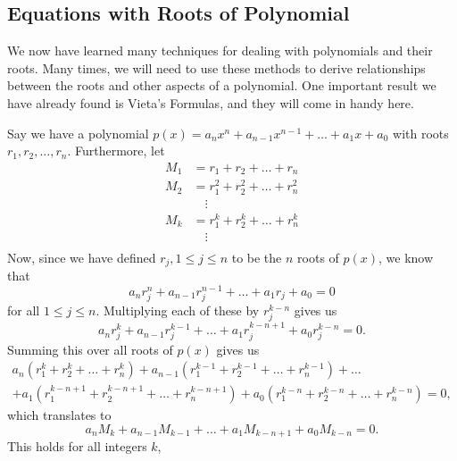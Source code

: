 \documentclass[12pt]{article}
\begin{document}
\newpage

\subsection{Equations with Roots of Polynomial}
We now have learned many techniques for dealing with polynomials and their roots. Many times, we will need to use these methods to derive relationships between the roots and other aspects of a polynomial. One important result we have already found is Vieta's Formulas, and they will come in handy here.
\begin{tcolorbox}[colback=green!10!white, colframe=green!25!black, title=Newton's Sums]
    Say we have a polynomial $p(x)=a_nx^n+a_{n-1}x^{n-1}+\dots+a_1x+a_0$ with roots $r_1,r_2,\dots,r_n$. Furthermore, let 
    \begin{align*}
        M_1&=r_1+r_2+\dots+r_n\\
        M_2&=r_1^2+r_2^2+\dots+r_n^2\\
        &\quad\!\! \vdots\\
        M_k&=r_1^k+r_2^k+\dots+r_n^k\\
        &\quad\!\! \vdots\\
    \end{align*}
    Now, since we have defined $r_j, 1\le j\le n$ to be the $n$ roots of $p(x)$, we know that
    \[
        a_nr_j^n+a_{n-1}r_j^{n-1}+\dots+a_1r_j+a_0=0
    \]
    for all $1\le j\le n$. Multiplying each of these by $r_j^{k-n}$ gives us 
    \[
        a_nr_j^k+a_{n-1}r_j^{k-1}+\dots+a_1r_j^{k-n+1}+a_0r_j^{k-n}=0.
    \]
    Summing this over all roots of $p(x)$ gives us
    \begin{multline*}
        a_n\left(r_1^k+r_2^k+\dots+r_n^k\right)+a_{n-1}\left(r_1^{k-1}+r_2^{k-1}+\dots+r_n^{k-1}\right)+\dots\\ + a_1\left(r_1^{k-n+1}+r_2^{k-n+1}+\dots+r_n^{k-n+1}\right)+a_0\left(r_1^{k-n}+r_2^{k-n}+\dots+r_n^{k-n}\right)=0,
    \end{multline*}
        which translates to 
        \[
            a_nM_k+a_{n-1}M_{k-1}+\dots+a_1M_{k-n+1}+a_0M_{k-n}=0.
        \]
        This holds for all integers $k$, 
\end{tcolorbox}
\end{document}
